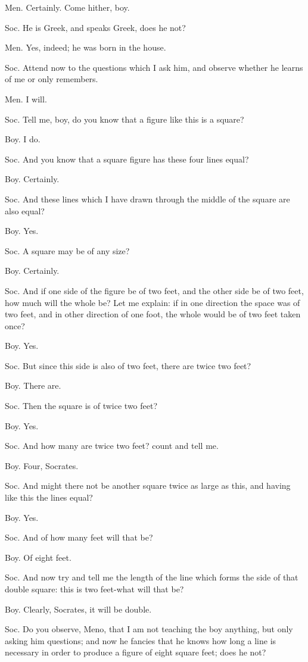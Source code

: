 Men. Certainly. Come hither, boy. 

Soc. He is Greek, and speaks Greek, does he not? 

Men. Yes, indeed; he was born in the house. 

Soc. Attend now to the questions which I ask him, and observe whether
he learns of me or only remembers. 

Men. I will. 

Soc. Tell me, boy, do you know that a figure like this is a square?

Boy. I do. 

Soc. And you know that a square figure has these four lines equal?

Boy. Certainly. 

Soc. And these lines which I have drawn through the middle of the
square are also equal? 

Boy. Yes. 

Soc. A square may be of any size? 

Boy. Certainly. 

Soc. And if one side of the figure be of two feet, and the other side
be of two feet, how much will the whole be? Let me explain: if in
one direction the space was of two feet, and in other direction of
one foot, the whole would be of two feet taken once? 

Boy. Yes. 

Soc. But since this side is also of two feet, there are twice two
feet? 

Boy. There are. 

Soc. Then the square is of twice two feet? 

Boy. Yes. 

Soc. And how many are twice two feet? count and tell me.

Boy. Four, Socrates. 

Soc. And might there not be another square twice as large as this,
and having like this the lines equal? 

Boy. Yes. 

Soc. And of how many feet will that be? 

Boy. Of eight feet. 

Soc. And now try and tell me the length of the line which forms the
side of that double square: this is two feet-what will that be?

Boy. Clearly, Socrates, it will be double. 

Soc. Do you observe, Meno, that I am not teaching the boy anything,
but only asking him questions; and now he fancies that he knows how
long a line is necessary in order to produce a figure of eight square
feet; does he not? 


